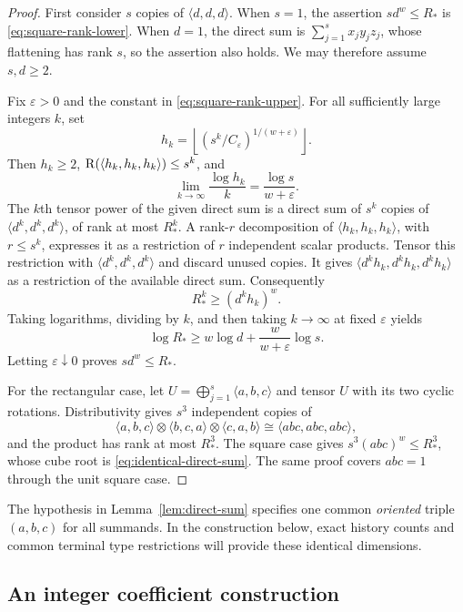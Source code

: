 \begin{proof}
First consider $s$ copies of $\langle d,d,d\rangle$.  When $s=1$,
the assertion $sd^w\leq R_*$ is \eqref{eq:square-rank-lower}.
When $d=1$, the direct sum is $\sum_{j=1}^s x_jy_jz_j$, whose
flattening has rank $s$, so the assertion also holds.  We may therefore
assume $s,d\geq2$.

Fix $\varepsilon>0$ and the constant in
\eqref{eq:square-rank-upper}.  For all sufficiently large integers $k$,
set
\[
 h_k=\left\lfloor
       (s^k/C_\varepsilon)^{1/(w+\varepsilon)}
       \right\rfloor.
\]
Then $h_k\geq2$,
$\operatorname{R}(\langle h_k,h_k,h_k\rangle)\leq s^k$, and
\[
 \lim_{k\to\infty}\frac{\log h_k}{k}
      =\frac{\log s}{w+\varepsilon}.
\]
The $k$th tensor power of the given direct sum is a direct sum of
$s^k$ copies of $\langle d^k,d^k,d^k\rangle$, of rank at most $R_*^k$.
A rank-$r$ decomposition of $\langle h_k,h_k,h_k\rangle$, with
$r\leq s^k$, expresses it as a restriction of $r$ independent scalar
products.  Tensor this restriction with
$\langle d^k,d^k,d^k\rangle$ and discard unused copies.  It gives
$\langle d^kh_k,d^kh_k,d^kh_k\rangle$ as a restriction of the
available direct sum.  Consequently
\[
 R_*^k\geq(d^kh_k)^w.
\]
Taking logarithms, dividing by $k$, and then taking $k\to\infty$
at fixed $\varepsilon$ yields
\[
 \log R_*\geq w\log d+\frac{w}{w+\varepsilon}\log s.
\]
Letting $\varepsilon\downarrow0$ proves $sd^w\leq R_*$.

For the rectangular case, let
$U=\bigoplus_{j=1}^s\langle a,b,c\rangle$ and tensor $U$ with its
two cyclic rotations.  Distributivity gives $s^3$ independent copies of
\[
 \langle a,b,c\rangle\otimes\langle b,c,a\rangle
       \otimes\langle c,a,b\rangle
       \cong\langle abc,abc,abc\rangle,
\]
and the product has rank at most $R_*^3$.  The square case gives
$s^3(abc)^w\leq R_*^3$, whose cube root is
\eqref{eq:identical-direct-sum}.  The same proof covers $abc=1$
through the unit square case.
\end{proof}

The hypothesis in Lemma~\ref{lem:direct-sum} specifies one common
\emph{oriented} triple $(a,b,c)$ for all summands.  In the construction
below, exact history counts and common terminal type restrictions will
provide these identical dimensions.

\subsection{An integer coefficient construction}

